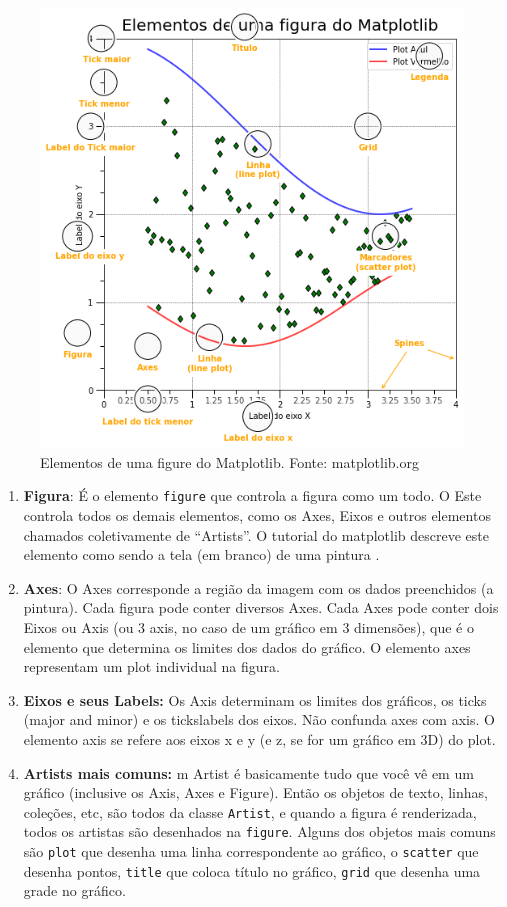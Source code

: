 \begin{figure}
    \centering
    \includegraphics[scale=0.7]{Images/anatomy.png}
    \caption{Elementos de uma figure do Matplotlib. Fonte: matplotlib.org}
    \label{fig:anatomy}

\end{figure}

\begin{enumerate}
    \item {\bf Figura}: É o elemento {\tt figure} que controla a figura como um todo. O Este controla todos os demais elementos, como os Axes, Eixos e outros elementos chamados coletivamente de ``Artists''. O tutorial do matplotlib descreve este elemento  como sendo a tela (em branco) de uma pintura .
    \item {\bf Axes}: O Axes corresponde a região da imagem com os dados preenchidos (a pintura). Cada figura pode conter diversos Axes. Cada Axes pode conter dois Eixos ou Axis (ou 3 axis, no caso de um gráfico em 3 dimensões), que é o elemento que determina os limites dos dados do gráfico. O elemento axes representam um plot individual na figura.
    \item {\bf Eixos e seus Labels:} Os Axis determinam os limites dos gráficos, os ticks (major and minor) e os tickslabels dos eixos. Não confunda axes com axis. O elemento axis se refere aos eixos x e y (e z, se for um gráfico em 3D) do plot.
    \item {\bf Artists mais comuns:} m Artist é basicamente tudo que você vê em um gráfico (inclusive os Axis, Axes e Figure). Então os objetos de texto, linhas, coleções, etc, são todos da classe {\tt Artist}, e quando a figura é renderizada, todos os artistas são desenhados na {\tt figure}. Alguns dos objetos mais comuns são {\tt plot} que desenha uma linha correspondente ao gráfico, o {\tt scatter} que desenha pontos, {\tt title} que coloca título no gráfico, {\tt grid} que desenha uma grade no gráfico. 
\end{enumerate}


